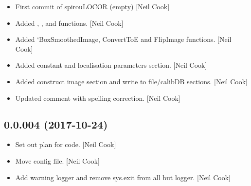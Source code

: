 \documentclass[a4paper,10pt,english]{report}
\begin{document}
\begin{itemize}
\item {} 
First commit of spirouLOCOR (empty) {[}Neil Cook{]}

\item {} 
Added , , and  functions.
{[}Neil Cook{]}

\item {} 
Added ‘BoxSmoothedImage, ConvertToE and FlipImage functions. {[}Neil
Cook{]}

\item {} 
Added  constant and localisation parameters section. {[}Neil
Cook{]}

\item {} 
Added construct image  section and write  to
file/calibDB sections. {[}Neil Cook{]}

\item {} 
Updated comment with spelling correction. {[}Neil Cook{]}

\end{itemize}


\subsection{0.0.004 (2017-10-24)}
\label{\detokenize{misc/changelog:id547}}\begin{itemize}
\item {} 
Set out plan for code. {[}Neil Cook{]}

\item {} 
Move config file. {[}Neil Cook{]}

\item {} 
Add warning logger and remove sys.exit from all but logger. {[}Neil
Cook{]}

\end{itemize}
\end{document}
